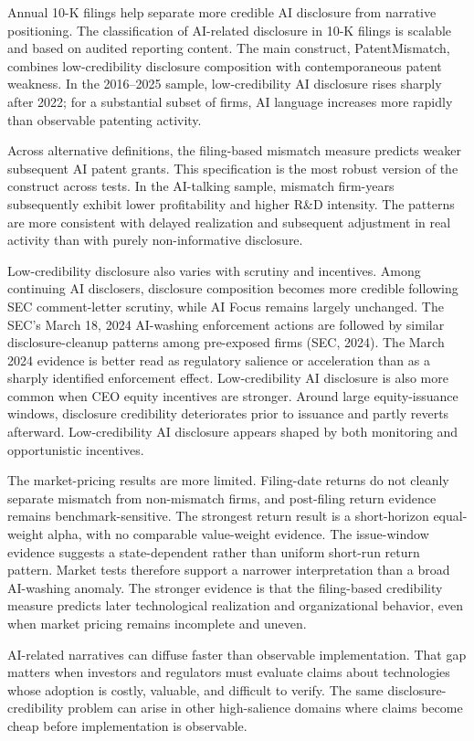 Annual 10-K filings help separate more credible AI disclosure from narrative positioning. The classification of AI-related disclosure in 10-K filings is scalable and based on audited reporting content. The main construct, PatentMismatch, combines low-credibility disclosure composition with contemporaneous patent weakness. In the 2016--2025 sample, low-credibility AI disclosure rises sharply after 2022; for a substantial subset of firms, AI language increases more rapidly than observable patenting activity.

Across alternative definitions, the filing-based mismatch measure predicts weaker subsequent AI patent grants. This specification is the most robust version of the construct across tests. In the AI-talking sample, mismatch firm-years subsequently exhibit lower profitability and higher R\&D intensity. The patterns are more consistent with delayed realization and subsequent adjustment in real activity than with purely non-informative disclosure.

Low-credibility disclosure also varies with scrutiny and incentives. Among continuing AI disclosers, disclosure composition becomes more credible following SEC comment-letter scrutiny, while AI Focus remains largely unchanged. The SEC's March 18, 2024 AI-washing enforcement actions are followed by similar disclosure-cleanup patterns among pre-exposed firms (SEC, 2024). The March 2024 evidence is better read as regulatory salience or acceleration than as a sharply identified enforcement effect. Low-credibility AI disclosure is also more common when CEO equity incentives are stronger. Around large equity-issuance windows, disclosure credibility deteriorates prior to issuance and partly reverts afterward. Low-credibility AI disclosure appears shaped by both monitoring and opportunistic incentives.

The market-pricing results are more limited. Filing-date returns do not cleanly separate mismatch from non-mismatch firms, and post-filing return evidence remains benchmark-sensitive. The strongest return result is a short-horizon equal-weight alpha, with no comparable value-weight evidence. The issue-window evidence suggests a state-dependent rather than uniform short-run return pattern. Market tests therefore support a narrower interpretation than a broad AI-washing anomaly. The stronger evidence is that the filing-based credibility measure predicts later technological realization and organizational behavior, even when market pricing remains incomplete and uneven.

AI-related narratives can diffuse faster than observable implementation. That gap matters when investors and regulators must evaluate claims about technologies whose adoption is costly, valuable, and difficult to verify. The same disclosure-credibility problem can arise in other high-salience domains where claims become cheap before implementation is observable.
